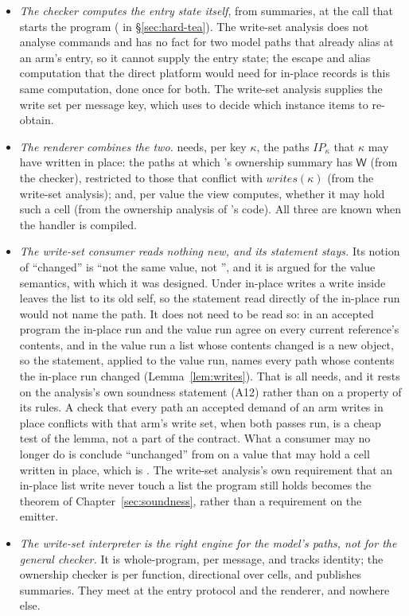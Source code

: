 \begin{itemize}
\item \emph{The checker computes the entry state itself}, from summaries, at the call that starts the
program ( in \S\ref{sec:hard-tea}). The write-set analysis does not analyse commands and has no
fact for two model paths that already alias at an arm's entry, so it cannot supply the entry state;
the escape and alias computation that the direct platform would need for in-place records is this same
computation, done once for both. The write-set analysis supplies the write set per message key, which
 uses to decide which instance items to re-obtain.
\item \emph{The renderer combines the two.}  needs, per key $\kappa$, the paths $\mathit{IP}_\kappa$
that $\kappa$ may have written in place: the paths at which 's ownership summary has
$\mathsf{W}$ (from the checker), restricted to those that conflict with $\mathit{writes}(\kappa)$ (from
the write-set analysis); and, per value the view computes, whether it may hold such a cell (from the
ownership analysis of 's code). All three are known when the handler is compiled.
\item \emph{The write-set consumer reads nothing new, and its statement stays.} Its notion of ``changed''
is ``not the same value, not \code{===}'', and it is argued for the value semantics, with which it was
designed. Under in-place writes a write inside  leaves the list \code{===} to its old
self, so the statement read directly of the in-place run would not name the path. It does not need to be
read so: in an accepted program the in-place run and the value run agree on every current reference's
contents, and in the value run a list whose contents changed is a new object, so the statement, applied to
the value run, names every path whose contents the in-place run changed (Lemma~\ref{lem:writes}). That is
all  needs, and it rests on the analysis's own soundness statement (A12) rather than on a property
of its rules. A check that every path an accepted demand of an arm writes in place conflicts with that
arm's write set, when both passes run, is a cheap test of the lemma, not a part of the contract. What a
consumer may no longer do is conclude ``unchanged'' from \code{===} on a value that may hold a cell written
in place, which is . The write-set analysis's own requirement that an in-place list write never
touch a list the program still holds becomes the theorem of Chapter~\ref{sec:soundness}, rather than a
requirement on the emitter.
\item \emph{The write-set interpreter is the right engine for the model's paths, not for the general
checker.} It is whole-program, per message, and tracks identity; the ownership checker is per
function, directional over cells, and publishes summaries. They meet at the entry protocol and the
renderer, and nowhere else.
\end{itemize}


